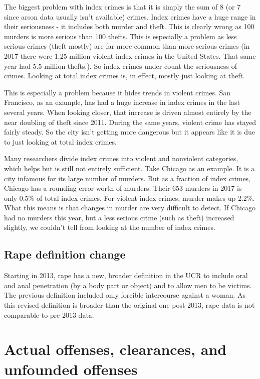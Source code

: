 \documentclass[
  12pt,
]{book}
\begin{document}
The biggest problem with index crimes is that it is simply the sum of 8 (or 7 since arson data usually isn't available) crimes. Index crimes have a huge range in their seriousness - it includes both murder and theft. This is clearly wrong as 100 murders is more serious than 100 thefts. This is especially a problem as less serious crimes (theft mostly) are far more common than more serious crimes (in 2017 there were 1.25 million violent index crimes in the United States. That same year had 5.5 million thefts.). So index crimes under-count the seriousness of crimes. Looking at total index crimes is, in effect, mostly just looking at theft.

This is especially a problem because it hides trends in violent crimes. San Francisco, as an example, has had a huge increase in index crimes in the last several years. When looking closer, that increase is driven almost entirely by the near doubling of theft since 2011. During the same years, violent crime has stayed fairly steady. So the city isn't getting more dangerous but it appears like it is due to just looking at total index crimes.

Many researchers divide index crimes into violent and nonviolent categories, which helps but is still not entirely sufficient. Take Chicago as an example. It is a city infamous for its large number of murders. But as a fraction of index crimes, Chicago has a rounding error worth of murders. Their 653 murders in 2017 is only 0.5\% of total index crimes. For violent index crimes, murder makes up 2.2\%. What this means is that changes in murder are very difficult to detect. If Chicago had no murders this year, but a less serious crime (such as theft) increased slightly, we couldn't tell from looking at the number of index crimes.

\hypertarget{rape-definition-change}{%
\subsection{Rape definition change}\label{rape-definition-change}}

Starting in 2013, rape has a new, broader definition in the UCR to include oral and anal penetration (by a body part or object) and to allow men to be victims. The previous definition included only forcible intercourse against a woman. As this revised definition is broader than the original one post-2013, rape data is not comparable to pre-2013 data.

\hypertarget{actual-offenses-clearances-and-unfounded-offenses}{%
\section{Actual offenses, clearances, and unfounded offenses}\label{actual-offenses-clearances-and-unfounded-offenses}}
\end{document}
